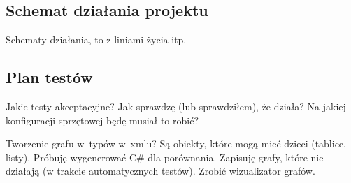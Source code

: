 %
%
%
%
%
%
%
%
%
%

\subsection{Schemat działania projektu}
Schematy działania, to z liniami życia itp.

\subsection{Plan testów}
Jakie testy akceptacyjne? Jak sprawdzę (lub sprawdziłem), że działa? Na jakiej konfiguracji sprzętowej będę musiał to robić?

Tworzenie grafu w~typów w~xmlu? Są obiekty, które mogą mieć dzieci (tablice, listy). Próbuję wygenerować C\# dla porównania. Zapisuję grafy, które nie działają (w trakcie automatycznych testów). Zrobić wizualizator grafów.

